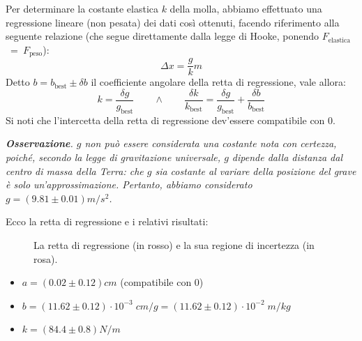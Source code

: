 \documentclass{article}
\newcommand*{\best}[1]{{#1}_\text{best}}
\newcommand*{\errrel}[1]{\frac{\delta #1}{{#1}_\text{best}}}
\begin{document}
Per determinare la costante elastica $k$ della molla, abbiamo effettuato
una regressione lineare (non pesata) dei dati così ottenuti, facendo
riferimento alla seguente relazione (che segue direttamente dalla legge
di Hooke, ponendo $F_\text{elastica}$ = $F_\text{peso}$):
\[\Delta x = \frac{g}{k} m\]
Detto $b=\best{b}\pm\delta b$ il coefficiente angolare della retta di regressione, vale allora:
\[k = \errrel{g} \qquad\wedge\qquad \errrel{k} = \errrel{g} + \errrel{b}\]
Si noti che l'intercetta della retta di regressione dev'essere compatibile con $0$.

\emph{
    \textbf{Osservazione}.
    $g$ non può essere considerata una costante nota con certezza,
    poiché, secondo la legge di gravitazione universale, $g$ dipende
    dalla distanza dal centro di massa della Terra: che $g$ sia costante
    al variare della posizione del grave è solo un'approssimazione.
    Pertanto, abbiamo considerato
    $g=\left(9.81\pm0.01\right)\unit{m\per s^2}$.
}

Ecco la retta di regressione e i relativi risultati:
\begin{figure}[H]
    \caption{
        La retta di regressione (in rosso)
        e la sua regione di incertezza (in rosa).
    }
\end{figure}
\begin{itemize}
    \item $a = \left(0.02\pm0.12\right)\unit{cm}$ (compatibile con 0)
    \item $
        b = \left(11.62\pm0.12\right)\cdot10^{-3}\;\unit{cm\per g}
          = \left(11.62\pm0.12\right)\cdot10^{-2}\;\unit{m\per kg}
    $
    \item $k = \left(84.4\pm0.8\right)\unit{N\per m}$
\end{itemize}
\end{document}
